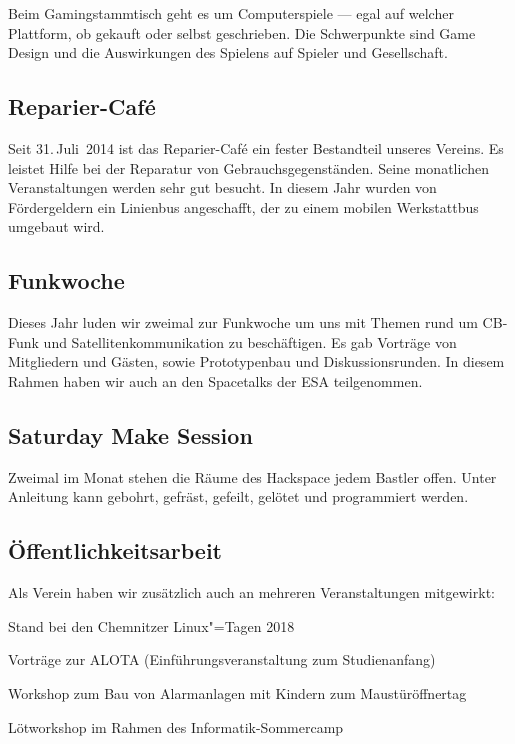 \documentclass[ngerman]{scrartcl}
\begin{document}
Beim Gamingstammtisch geht es um Computerspiele — egal auf welcher
Plattform, ob gekauft oder selbst geschrieben. Die Schwerpunkte sind
Game Design und die Auswirkungen des Spielens auf Spieler und
Gesellschaft.

\subsection{Reparier-Café}

Seit 31.\,Juli~2014 ist das Reparier-Café ein fester Bestandteil unseres Vereins.
Es leistet Hilfe bei der Reparatur von Gebrauchsgegenständen.
Seine monatlichen Veranstaltungen werden sehr gut besucht. In diesem Jahr wurden
von Fördergeldern ein Linienbus angeschafft, der zu einem mobilen Werkstattbus
umgebaut wird.

\subsection{Funkwoche}

Dieses Jahr luden wir zweimal zur Funkwoche um uns mit Themen rund um CB-Funk und Satellitenkommunikation
zu beschäftigen. Es gab Vorträge von Mitgliedern und Gästen, sowie Prototypenbau und Diskussionsrunden.
In diesem Rahmen haben wir auch an den Spacetalks der ESA teilgenommen.

\subsection{Saturday Make Session}

Zweimal im Monat stehen die Räume des Hackspace jedem Bastler offen. Unter
Anleitung kann gebohrt, gefräst, gefeilt, gelötet und programmiert werden.

\subsection{Öffentlichkeitsarbeit}
Als Verein haben wir zusätzlich auch an mehreren Veranstaltungen mitgewirkt:
\begin{compactitem}
	\item Stand bei den Chemnitzer Linux"=Tagen 2018
	\item Vorträge zur ALOTA (Einführungsveranstaltung zum Studienanfang)
	\item Workshop zum Bau von Alarmanlagen mit Kindern zum Maustüröffnertag
	\item Lötworkshop im Rahmen des Informatik-Sommercamp
\end{compactitem}
\end{document}
